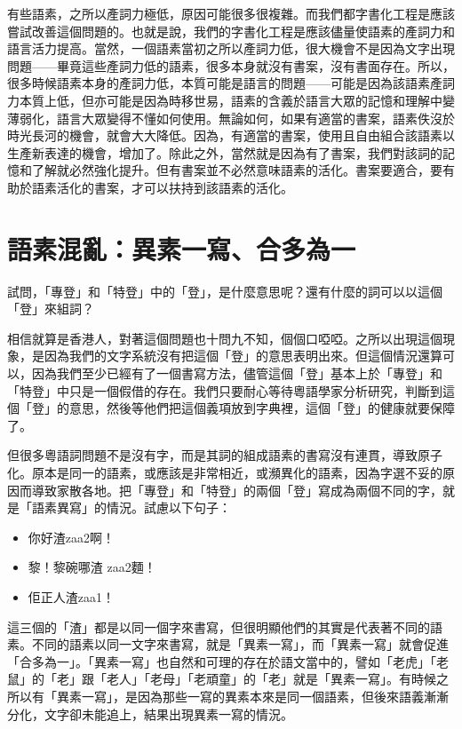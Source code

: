\documentclass[a5paper, 10pt, openany]{book} %
\begin{document}
有些語素，之所以產詞力極低，原因可能很多很複雜。而我們都字書化工程是應該嘗試改善這個問題的。也就是說，我們的字書化工程是應該儘量使語素的產詞力和語言活力提高。當然，一個語素當初之所以產詞力低，很大機會不是因為文字出現問題——畢竟這些產詞力低的語素，很多本身就沒有書案，沒有書面存在。所以，很多時候語素本身的產詞力低，本質可能是語言的問題——可能是因為該語素產詞力本質上低，但亦可能是因為時移世易，語素的含義於語言大眾的記憶和理解中變薄弱化，語言大眾變得不懂如何使用。無論如何，如果有適當的書案，語素佚沒於時光長河的機會，就會大大降低。因為，有適當的書案，使用且自由組合該語素以生產新表達的機會，增加了。除此之外，當然就是因為有了書案，我們對該詞的記憶和了解就必然強化提升。但有書案並不必然意味語素的活化。書案要適合，要有助於語素活化的書案，才可以扶持到該語素的活化。

\section{語素混亂：異素一寫、合多為一}

試問，「專登」和「特登」中的「登」，是什麼意思呢？還有什麼的詞可以以這個「登」來組詞？

相信就算是香港人，對著這個問題也十問九不知，個個口啞啞。之所以出現這個現象，是因為我們的文字系統沒有把這個「登」的意思表明出來。但這個情況還算可以，因為我們至少已經有了一個書寫方法，儘管這個「登」基本上於「專登」和「特登」中只是一個假借的存在。我們只要耐心等待粵語學家分析研究，判斷到這個「登」的意思，然後等他們把這個義項放到字典裡，這個「登」的健康就要保障了。

但很多粵語詞問題不是沒有字，而是其詞的組成語素的書寫沒有連貫，導致原子化。原本是同一的語素，或應該是非常相近，或瀕異化的語素，因為字選不妥的原因而導致家散各地。把「專登」和「特登」的兩個「登」寫成為兩個不同的字，就是「語素異寫」的情況。試慮以下句子：

\begin{itemize}
  \item 你好渣zaa2啊！
  \item 黎！黎碗哪渣 zaa2麵！
  \item 佢正人渣zaa1！
\end{itemize}
  
  
  

這三個的「渣」都是以同一個字來書寫，但很明顯他們的其實是代表著不同的語素。不同的語素以同一文字來書寫，就是「異素一寫」，而「異素一寫」就會促進「合多為一」。「異素一寫」也自然和可理的存在於語文當中的，譬如「老虎」「老鼠」的「老」跟「老人」「老母」「老頑童」的「老」就是「異素一寫」。有時候之所以有「異素一寫」，是因為那些一寫的異素本來是同一個語素，但後來語義漸漸分化，文字卻未能追上，結果出現異素一寫的情況。
\end{document}
